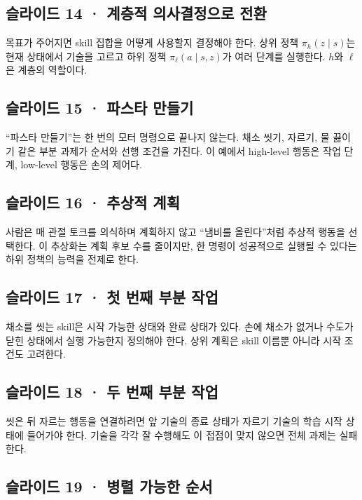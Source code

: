 \documentclass[11pt,a4paper]{article}
\begin{document}
\subsection{슬라이드 14 · 계층적 의사결정으로 전환}

목표가 주어지면 skill 집합을 어떻게 사용할지 결정해야 한다. 상위 정책 $\pi_h(z\mid s)$는 현재 상태에서 기술을 고르고 하위 정책 $\pi_\ell(a\mid s,z)$가 여러 단계를 실행한다. $h$와 $\ell$은 계층의 역할이다.\par

\subsection{슬라이드 15 · 파스타 만들기}

“파스타 만들기”는 한 번의 모터 명령으로 끝나지 않는다. 채소 씻기, 자르기, 물 끓이기 같은 부분 과제가 순서와 선행 조건을 가진다. 이 예에서 high-level 행동은 작업 단계, low-level 행동은 손의 제어다.\par

\subsection{슬라이드 16 · 추상적 계획}

사람은 매 관절 토크를 의식하며 계획하지 않고 “냄비를 올린다”처럼 추상적 행동을 선택한다. 이 추상화는 계획 후보 수를 줄이지만, 한 명령이 성공적으로 실행될 수 있다는 하위 정책의 능력을 전제로 한다.\par

\subsection{슬라이드 17 · 첫 번째 부분 작업}

채소를 씻는 skill은 시작 가능한 상태와 완료 상태가 있다. 손에 채소가 없거나 수도가 닫힌 상태에서 실행 가능한지 정의해야 한다. 상위 계획은 skill 이름뿐 아니라 시작 조건도 고려한다.\par

\subsection{슬라이드 18 · 두 번째 부분 작업}

씻은 뒤 자르는 행동을 연결하려면 앞 기술의 종료 상태가 자르기 기술의 학습 시작 상태에 들어가야 한다. 기술을 각각 잘 수행해도 이 접점이 맞지 않으면 전체 과제는 실패한다.\par

\subsection{슬라이드 19 · 병렬 가능한 순서}
\end{document}
